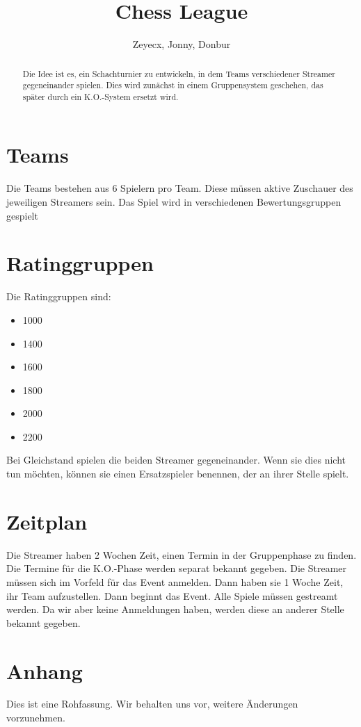 \documentclass{article}
\title{Chess League}
\author{Zeyecx, Jonny, Donbur}
\begin{document}
	\maketitle
	 
\begin{abstract}
	Die Idee ist es, ein Schachturnier zu entwickeln, in dem Teams verschiedener Streamer gegeneinander spielen.
	Dies wird zunächst in einem Gruppensystem geschehen, das später durch ein K.O.-System ersetzt wird. 
\end{abstract}


\section{Teams}
Die Teams bestehen aus 6 Spielern pro Team. Diese müssen aktive Zuschauer des jeweiligen Streamers sein. 
Das Spiel wird in verschiedenen Bewertungsgruppen gespielt

\section{Ratinggruppen}

Die Ratinggruppen sind:
\begin{itemize}
	\item 1000
	\item 1400 
	\item 1600
	\item 1800
	\item 2000
	\item 2200
\end{itemize}
Bei Gleichstand spielen die beiden Streamer gegeneinander. Wenn sie dies nicht tun möchten, können sie einen Ersatzspieler benennen, der an ihrer Stelle spielt.

\section{Zeitplan}
Die Streamer haben 2 Wochen Zeit, einen Termin in der Gruppenphase zu finden. Die Termine für die K.O.-Phase werden separat bekannt gegeben.
Die Streamer müssen sich im Vorfeld für das Event anmelden. Dann haben sie 1 Woche Zeit, ihr Team aufzustellen.
Dann beginnt das Event.
Alle Spiele müssen gestreamt werden.
Da wir aber keine Anmeldungen haben, werden diese an anderer Stelle bekannt gegeben.

\section{Anhang}
Dies ist eine Rohfassung. Wir behalten uns vor, weitere Änderungen vorzunehmen.
	
\end{document}
